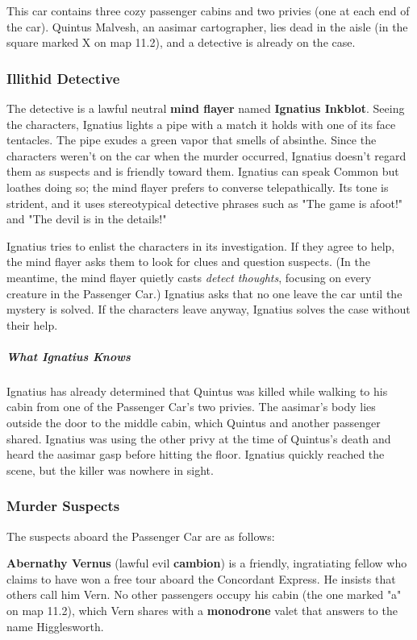 \documentclass[10pt,a4paper,twoside,bg=print,twocolumn,openany,nodeprecatedcode]{dndbook}
\begin{document}
This car contains three cozy passenger cabins and two privies (one at each end of the car). Quintus Malvesh, an aasimar cartographer, lies dead in the aisle (in the square marked X on map 11.2), and a detective is already on the case.

\subsubsection{Illithid Detective}
The detective is a lawful neutral \textbf{mind flayer} named \textbf{Ignatius Inkblot}. Seeing the characters, Ignatius lights a pipe with a match it holds with one of its face tentacles. The pipe exudes a green vapor that smells of absinthe. Since the characters weren't on the car when the murder occurred, Ignatius doesn't regard them as suspects and is friendly toward them. Ignatius can speak Common but loathes doing so; the mind flayer prefers to converse telepathically. Its tone is strident, and it uses stereotypical detective phrases such as "The game is afoot!" and "The devil is in the details!"

Ignatius tries to enlist the characters in its investigation. If they agree to help, the mind flayer asks them to look for clues and question suspects. (In the meantime, the mind flayer quietly casts \textit{detect thoughts}, focusing on every creature in the Passenger Car.) Ignatius asks that no one leave the car until the mystery is solved. If the characters leave anyway, Ignatius solves the case without their help.

\subparagraph{What Ignatius Knows}
Ignatius has already determined that Quintus was killed while walking to his cabin from one of the Passenger Car's two privies. The aasimar's body lies outside the door to the middle cabin, which Quintus and another passenger shared. Ignatius was using the other privy at the time of Quintus's death and heard the aasimar gasp before hitting the floor. Ignatius quickly reached the scene, but the killer was nowhere in sight.

\subsubsection{Murder Suspects}
The suspects aboard the Passenger Car are as follows:

\textbf{Abernathy Vernus} (lawful evil \textbf{cambion}) is a friendly, ingratiating fellow who claims to have won a free tour aboard the Concordant Express. He insists that others call him Vern. No other passengers occupy his cabin (the one marked "a" on map 11.2), which Vern shares with a \textbf{monodrone} valet that answers to the name Higglesworth.
\end{document}
